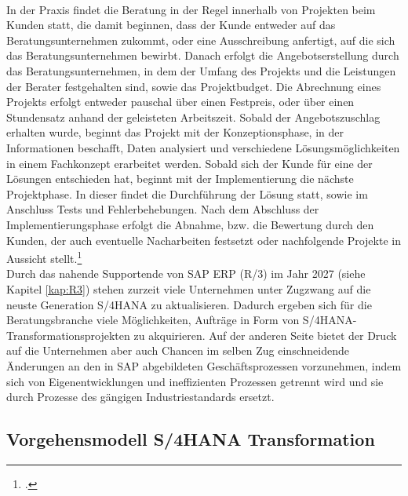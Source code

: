 \\In der Praxis findet die Beratung in der Regel innerhalb von Projekten beim Kunden statt, die damit beginnen, dass der Kunde entweder auf das Beratungsunternehmen zukommt, oder eine Ausschreibung anfertigt, auf die sich das Beratungsunternehmen bewirbt. Danach erfolgt die Angebotserstellung durch das Beratungsunternehmen, in dem der Umfang des Projekts und die Leistungen der Berater festgehalten sind, sowie das Projektbudget. Die Abrechnung eines Projekts erfolgt entweder pauschal über einen Festpreis, oder über einen Stundensatz anhand der geleisteten Arbeitszeit. Sobald der Angebotszuschlag erhalten wurde, beginnt das Projekt mit der Konzeptionsphase, in der Informationen beschafft, Daten analysiert und verschiedene Lösungsmöglichkeiten in einem Fachkonzept erarbeitet werden. Sobald sich der Kunde für eine der Lösungen entschieden hat, beginnt mit der Implementierung die nächste Projektphase. In dieser findet die Durchführung der Lösung statt, sowie im Anschluss Tests und Fehlerbehebungen. Nach dem Abschluss der Implementierungsphase erfolgt die Abnahme, bzw. die Bewertung durch den Kunden, der auch eventuelle Nacharbeiten festsetzt oder nachfolgende Projekte in Aussicht stellt.\footcite[Vgl.][]{gabler-beratung}
\\Durch das nahende Supportende von SAP ERP (R/3) im Jahr 2027 (siehe Kapitel \ref{kap:R3}) stehen zurzeit viele Unternehmen unter Zugzwang auf die neuste Generation S/4HANA zu aktualisieren. Dadurch ergeben sich für die Beratungsbranche viele Möglichkeiten, Aufträge in Form von S/4HANA-Transformationsprojekten zu akquirieren. Auf der anderen Seite bietet der Druck auf die Unternehmen aber auch Chancen im selben Zug einschneidende Änderungen an den in SAP abgebildeten Geschäftsprozessen vorzunehmen, indem sich von Eigenentwicklungen und ineffizienten Prozessen getrennt wird und sie durch Prozesse des gängigen Industriestandards ersetzt.

\subsection{Vorgehensmodell S/4HANA Transformation}

